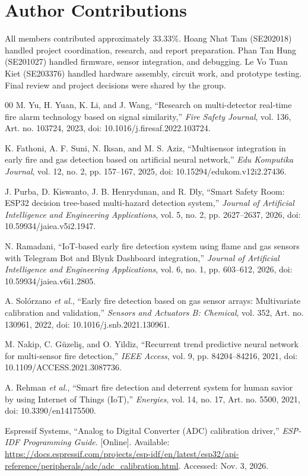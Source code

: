 \documentclass[conference,onecolumn]{IEEEtran}
\begin{document}
\section*{Author Contributions}
All members contributed approximately 33.33\%. Hoang Nhat Tam (SE202018) handled project coordination, research, and report preparation. Phan Tan Hung (SE201027) handled firmware, sensor integration, and debugging. Le Vo Tuan Kiet (SE203376) handled hardware assembly, circuit work, and prototype testing. Final review and project decisions were shared by the group.

\begin{thebibliography}{00}
 M. Yu, H. Yuan, K. Li, and J. Wang, ``Research on multi-detector real-time fire alarm technology based on signal similarity,'' \emph{Fire Safety Journal}, vol. 136, Art. no. 103724, 2023, doi: 10.1016/j.firesaf.2022.103724.

 K. Fathoni, A. F. Suni, N. Iksan, and M. S. Aziz, ``Multisensor integration in early fire and gas detection based on artificial neural network,'' \emph{Edu Komputika Journal}, vol. 12, no. 2, pp. 157--167, 2025, doi: 10.15294/edukom.v12i2.27436.

 J. Purba, D. Kiswanto, J. B. Henrydunan, and R. Dly, ``Smart Safety Room: ESP32 decision tree-based multi-hazard detection system,'' \emph{Journal of Artificial Intelligence and Engineering Applications}, vol. 5, no. 2, pp. 2627--2637, 2026, doi: 10.59934/jaiea.v5i2.1947.

 N. Ramadani, ``IoT-based early fire detection system using flame and gas sensors with Telegram Bot and Blynk Dashboard integration,'' \emph{Journal of Artificial Intelligence and Engineering Applications}, vol. 6, no. 1, pp. 603--612, 2026, doi: 10.59934/jaiea.v6i1.2805.

 A. Sol\'orzano \emph{et al.}, ``Early fire detection based on gas sensor arrays: Multivariate calibration and validation,'' \emph{Sensors and Actuators B: Chemical}, vol. 352, Art. no. 130961, 2022, doi: 10.1016/j.snb.2021.130961.

 M. Nakip, C. G\"uzeli\c{s}, and O. Yildiz, ``Recurrent trend predictive neural network for multi-sensor fire detection,'' \emph{IEEE Access}, vol. 9, pp. 84204--84216, 2021, doi: 10.1109/ACCESS.2021.3087736.

 A. Rehman \emph{et al.}, ``Smart fire detection and deterrent system for human savior by using Internet of Things (IoT),'' \emph{Energies}, vol. 14, no. 17, Art. no. 5500, 2021, doi: 10.3390/en14175500.

 Espressif Systems, ``Analog to Digital Converter (ADC) calibration driver,'' \emph{ESP-IDF Programming Guide}. [Online]. Available: \url{https://docs.espressif.com/projects/esp-idf/en/latest/esp32/api-reference/peripherals/adc/adc_calibration.html}. Accessed: Nov. 3, 2026.
\end{thebibliography}
\end{document}
